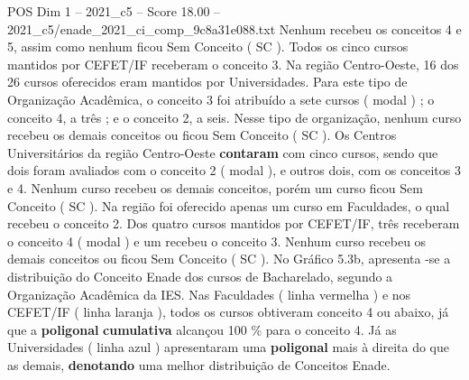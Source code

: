 \begin{textsample}{POS Dim 1 – 2021\_c5 – Score 18.00 – 2021\_c5/enade\_2021\_ci\_comp\_9c8a31e088.txt}
Nenhum recebeu os conceitos 4 e 5, assim como nenhum ficou Sem Conceito ( SC ).
Todos os cinco cursos mantidos por CEFET/IF receberam o conceito 3.
Na região Centro-Oeste, 16 dos 26 cursos oferecidos eram mantidos por Universidades.
Para este tipo de Organização Acadêmica, o conceito 3 foi atribuído a sete cursos ( modal ) ; o conceito 4, a três ; e o conceito 2, a seis.
Nesse tipo de organização, nenhum curso recebeu os demais conceitos ou ficou Sem Conceito ( SC ).
Os Centros Universitários da região Centro-Oeste \textbf{contaram} com cinco cursos, sendo que dois foram avaliados com o conceito 2 ( modal ), e outros dois, com os conceitos 3 e 4.
Nenhum curso recebeu os demais conceitos, porém um curso ficou Sem Conceito ( SC ).
Na região foi oferecido apenas um curso em Faculdades, o qual recebeu o conceito 2.
Dos quatro cursos mantidos por CEFET/IF, três receberam o conceito 4 ( modal ) e um recebeu o conceito 3.
Nenhum curso recebeu os demais conceitos ou ficou Sem Conceito ( SC ).
No Gráfico 5.3b, apresenta -se a distribuição do Conceito Enade dos cursos de Bacharelado, segundo a Organização Acadêmica da IES.
Nas Faculdades ( linha vermelha ) e nos CEFET/IF ( linha laranja ), todos os cursos obtiveram conceito 4 ou abaixo, já que a \textbf{poligonal} \textbf{cumulativa} alcançou 100 \% para o conceito 4.
Já as Universidades ( linha azul ) apresentaram uma \textbf{poligonal} mais à direita do que as demais, \textbf{denotando} uma melhor distribuição de Conceitos Enade.

\end{textsample}
